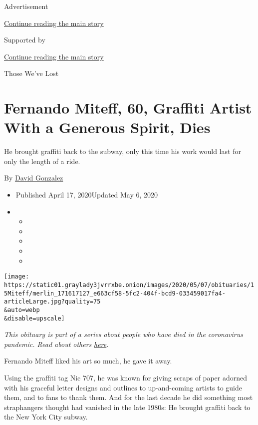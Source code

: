 Advertisement

\protect\hyperlink{after-top}{Continue reading the main story}

Supported by

\protect\hyperlink{after-sponsor}{Continue reading the main story}

Those We've Lost

\hypertarget{fernando-miteff-60-graffiti-artist-with-a-generous-spirit-dies}{%
\section{Fernando Miteff, 60, Graffiti Artist With a Generous Spirit,
Dies}\label{fernando-miteff-60-graffiti-artist-with-a-generous-spirit-dies}}

He brought graffiti back to the subway, only this time his work would
last for only the length of a ride.

By \href{https://www.nytimes3xbfgragh.onion/by/david-gonzalez}{David
Gonzalez}

\begin{itemize}
\item
  Published April 17, 2020Updated May 6, 2020
\item
  \begin{itemize}
  \item
  \item
  \item
  \item
  \item
  \end{itemize}
\end{itemize}

\texttt{[image: https://static01.graylady3jvrrxbe.onion/images/2020/05/07/obituaries/15Miteff/merlin\_171617127\_e663cf58-5fc2-404f-bcd9-033459017fa4-articleLarge.jpg?quality=75\\\&auto=webp\\\&disable=upscale]}

\emph{This obituary is part of a series about people who have died in
the coronavirus pandemic. Read about others}
\href{https://www.nytimes3xbfgragh.onion/series/people-who-have-died-of-the-coronavirus}{\emph{here}}\emph{.}

Fernando Miteff liked his art so much, he gave it away.

Using the graffiti tag Nic 707, he was known for giving scraps of paper
adorned with his graceful letter designs and outlines to up-and-coming
artists to guide them, and to fans to thank them. And for the last
decade he did something most straphangers thought had vanished in the
late 1980s: He brought graffiti back to the New York City subway.

